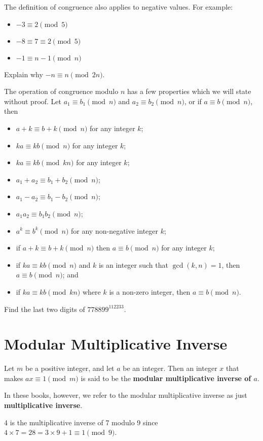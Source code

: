 \newpage

The definition of congruence also applies to negative values. For example:
\begin{itemize}
    \item $-3 \equiv 2 \pmod5$
    \item $-8 \equiv 7 \equiv 2 \pmod5$
    \item $-1 \equiv n-1 \pmod{n}$
\end{itemize}

\begin{exercise}
    Explain why $-n \equiv n \pmod{2n}$.
\end{exercise}

The operation of congruence modulo $n$ has a few properties which we will state without proof. Let $a_1 \equiv b_1 \pmod n$ and $a_2 \equiv b_2 \pmod n$, or if $a \equiv b \pmod n$, then
\begin{itemize}
    \item $a + k \equiv b + k \pmod n$ for any integer $k$;
    \item $ka \equiv kb \pmod n$ for any integer $k$;
    \item $ka \equiv kb \pmod {kn}$ for any integer $k$;
    \item $a_1 + a_2 \equiv b_1 + b_2 \pmod n$;
    \item $a_1 - a_2 \equiv b_1 - b_2 \pmod n$;
    \item $a_1a_2 \equiv b_1b_2 \pmod n$;
    \item $a^k \equiv b^k \pmod n$ for any non-negative integer $k$;
    \item if $a+k \equiv b+k \pmod n$ then $a \equiv b \pmod n$ for any integer $k$;
    \item if $ka \equiv kb \pmod n$ and $k$ is an integer such that $\gcd(k, n) = 1$, then $a \equiv b \pmod n$; and
    \item if $ka \equiv kb \pmod{kn}$ where $k$ is a non-zero integer, then $a \equiv b \pmod n$.
\end{itemize}

\begin{exercise}
    Find the last two digits of $778899^{112233}$.
\end{exercise}

\section{Modular Multiplicative Inverse}
\begin{definition}
    Let $m$ be a positive integer, and let $a$ be an integer. Then an integer $x$ that makes $ax \equiv 1 \pmod m$ is said to be the \textbf{modular multiplicative inverse of $a$}.
\end{definition}
\begin{remark}
    In these books, however, we refer to the modular multiplicative inverse as just \textbf{multiplicative inverse}.
\end{remark}
\begin{example}
    4 is the multiplicative inverse of 7 modulo 9 since $4 \times 7 = 28 = 3 \times 9 + 1 \equiv 1 \pmod 9$.
\end{example}

